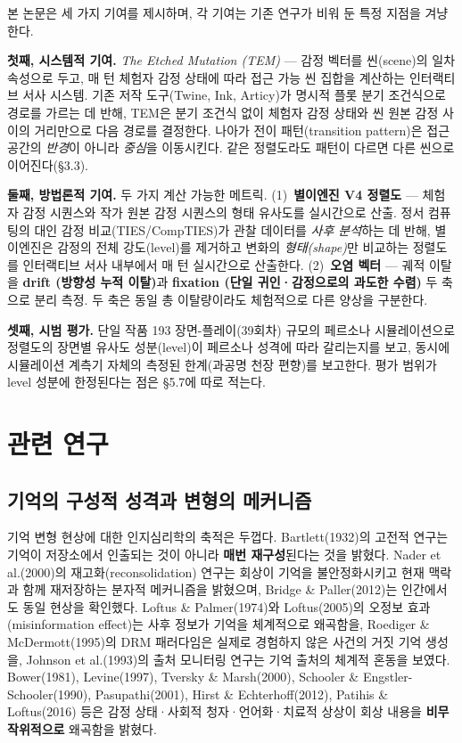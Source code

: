 \documentclass[11pt, a4paper]{article}
\begin{document}
본 논문은 세 가지 기여를 제시하며, 각 기여는 기존 연구가 비워 둔 특정 지점을 겨냥한다.

\textbf{첫째, 시스템적 기여.} \textit{The Etched Mutation (TEM)} --- 감정 벡터를 씬(scene)의 일차 속성으로 두고, 매 턴 체험자 감정 상태에 따라 접근 가능 씬 집합을 계산하는 인터랙티브 서사 시스템. 기존 저작 도구(Twine, Ink, Articy)가 명시적 플롯 분기 조건식으로 경로를 가르는 데 반해, TEM은 분기 조건식 없이 체험자 감정 상태와 씬 원본 감정 사이의 거리만으로 다음 경로를 결정한다. 나아가 전이 패턴(transition pattern)은 접근 공간의 \textit{반경}이 아니라 \textit{중심}을 이동시킨다. 같은 정렬도라도 패턴이 다르면 다른 씬으로 이어진다(\S3.3).

\textbf{둘째, 방법론적 기여.} 두 가지 계산 가능한 메트릭. (1)~\textbf{별이엔진 V4 정렬도} --- 체험자 감정 시퀀스와 작가 원본 감정 시퀀스의 형태 유사도를 실시간으로 산출. 정서 컴퓨팅의 대인 감정 비교(TIES/CompTIES)가 관찰 데이터를 \textit{사후 분석}하는 데 반해, 별이엔진은 감정의 전체 강도(level)를 제거하고 변화의 \textit{형태(shape)}만 비교하는 정렬도를 인터랙티브 서사 내부에서 매 턴 실시간으로 산출한다. (2)~\textbf{오염 벡터} --- 궤적 이탈을 \textbf{drift (방향성 누적 이탈)}과 \textbf{fixation (단일 귀인·감정으로의 과도한 수렴)} 두 축으로 분리 측정. 두 축은 동일 총 이탈량이라도 체험적으로 다른 양상을 구분한다.

\textbf{셋째, 시범 평가.} 단일 작품 193 장면-플레이(39회차) 규모의 페르소나 시뮬레이션으로 정렬도의 장면별 유사도 성분(level)이 페르소나 성격에 따라 갈리는지를 보고, 동시에 시뮬레이션 계측기 자체의 측정된 한계(과공명 천장 편향)를 보고한다. 평가 범위가 level 성분에 한정된다는 점은 \S5.7에 따로 적는다.

\section{관련 연구}

\subsection{기억의 구성적 성격과 변형의 메커니즘}

기억 변형 현상에 대한 인지심리학의 축적은 두껍다. Bartlett(1932)의 고전적 연구는 기억이 저장소에서 인출되는 것이 아니라 \textbf{매번 재구성}된다는 것을 밝혔다. Nader et al.(2000)의 재고화(reconsolidation) 연구는 회상이 기억을 불안정화시키고 현재 맥락과 함께 재저장하는 분자적 메커니즘을 밝혔으며, Bridge \& Paller(2012)는 인간에서도 동일 현상을 확인했다. Loftus \& Palmer(1974)와 Loftus(2005)의 오정보 효과(misinformation effect)는 사후 정보가 기억을 체계적으로 왜곡함을, Roediger \& McDermott(1995)의 DRM 패러다임은 실제로 경험하지 않은 사건의 거짓 기억 생성을, Johnson et al.(1993)의 출처 모니터링 연구는 기억 출처의 체계적 혼동을 보였다. Bower(1981), Levine(1997), Tversky \& Marsh(2000), Schooler \& Engstler-Schooler(1990), Pasupathi(2001), Hirst \& Echterhoff(2012), Patihis \& Loftus(2016) 등은 감정 상태·사회적 청자·언어화·치료적 상상이 회상 내용을 \textbf{비무작위적으로} 왜곡함을 밝혔다.
\end{document}
